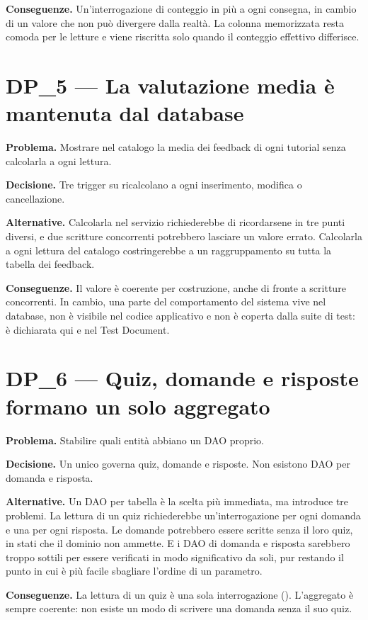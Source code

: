 \textbf{Conseguenze.} Un'interrogazione di conteggio in più a ogni consegna,
in cambio di un valore che non può divergere dalla realtà. La colonna
memorizzata resta comoda per le letture e viene riscritta solo quando il
conteggio effettivo differisce.

\section{DP\_5 — La valutazione media è mantenuta dal database}

\textbf{Problema.} Mostrare nel catalogo la media dei feedback di ogni
tutorial senza calcolarla a ogni lettura.

\textbf{Decisione.} Tre trigger su  ricalcolano
 a ogni inserimento, modifica o cancellazione.

\textbf{Alternative.} Calcolarla nel servizio richiederebbe di ricordarsene
in tre punti diversi, e due scritture concorrenti potrebbero lasciare un
valore errato. Calcolarla a ogni lettura del catalogo costringerebbe a un
raggruppamento su tutta la tabella dei feedback.

\textbf{Conseguenze.} Il valore è coerente per costruzione, anche di fronte a
scritture concorrenti. In cambio, una parte del comportamento del sistema
vive nel database, non è visibile nel codice applicativo e non è coperta
dalla suite di test: è dichiarata qui e nel Test Document.

\section{DP\_6 — Quiz, domande e risposte formano un solo aggregato}

\textbf{Problema.} Stabilire quali entità abbiano un DAO proprio.

\textbf{Decisione.} Un unico  governa quiz, domande e risposte.
Non esistono DAO per domanda e risposta.

\textbf{Alternative.} Un DAO per tabella è la scelta più immediata, ma
introduce tre problemi. La lettura di un quiz richiederebbe
un'interrogazione per ogni domanda e una per ogni risposta. Le domande
potrebbero essere scritte senza il loro quiz, in stati che il dominio non
ammette. E i DAO di domanda e risposta sarebbero troppo sottili per essere
verificati in modo significativo da soli, pur restando il punto in cui è più
facile sbagliare l'ordine di un parametro.

\textbf{Conseguenze.} La lettura di un quiz è una sola interrogazione
(). L'aggregato è sempre coerente: non esiste un modo di
scrivere una domanda senza il suo quiz.

